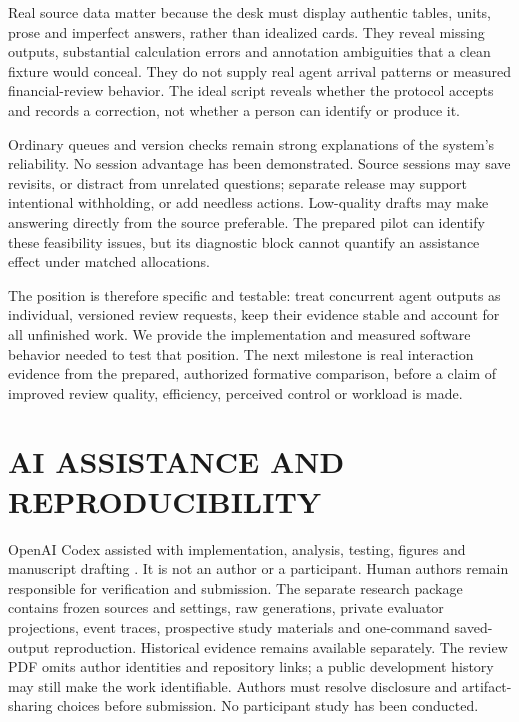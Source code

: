 \documentclass[a4paper,twoside]{article}
\begin{document}
Real source data matter because the desk must display authentic tables, units,
prose and imperfect answers, rather than idealized cards. They reveal missing
outputs, substantial calculation errors and annotation ambiguities that a clean
fixture would conceal. They do not supply real agent arrival patterns or measured
financial-review behavior. The ideal script reveals whether the protocol accepts
and records a correction, not whether a person can identify or produce it.

Ordinary queues and version checks remain strong explanations of the system's
reliability. No session advantage has been demonstrated. Source sessions may save
revisits, or distract from unrelated questions; separate release may support
intentional withholding, or add needless actions. Low-quality drafts may make
answering directly from the source preferable. The prepared pilot can identify
these feasibility issues, but its diagnostic block cannot quantify an assistance
effect under matched allocations.

The position is therefore specific and testable: treat concurrent agent outputs
as individual, versioned review requests, keep their evidence stable and account
for all unfinished work. We provide the implementation and measured software
behavior needed to test that position. The next milestone is real interaction
evidence from the prepared, authorized formative comparison, before a claim of
improved review quality, efficiency, perceived control or workload is made.

\section*{AI ASSISTANCE AND REPRODUCIBILITY}
OpenAI Codex assisted with implementation, analysis, testing, figures and manuscript
drafting \cite{codex}. It is not an author or a participant. Human authors remain
responsible for verification and submission. The separate research package contains
frozen sources and settings, raw generations, private evaluator projections,
event traces, prospective study materials and one-command saved-output reproduction.
Historical evidence remains available separately. The review PDF omits author
identities and repository links; a public development history may still make the
work identifiable. Authors must resolve disclosure and artifact-sharing choices
before submission. No participant study has been conducted.



\end{document}
